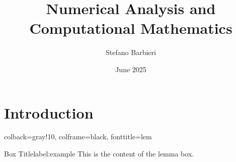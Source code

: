 \documentclass{article}
\title{Numerical Analysis and Computational Mathematics}
\author{Stefano Barbieri}
\date{June 2025}
\begin{document}
\maketitle

\section{Introduction}
%
{colback=gray!10, colframe=black, fonttitle=\bfseries}{lem}

\begin{lemma}{Box Title}{label:example}
This is the content of the lemma box.
\end{lemma}
\end{document}
